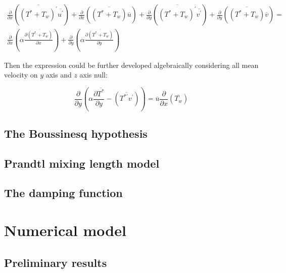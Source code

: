 \documentclass[10pt]{article} %
\begin{document}
\begin{equation}
\begin{split}
\frac{\partial{}}{\partial{x}} \left(\overline{(T^\ast + T_w)^\prime} \overline{ u^\prime}\right) + \frac{\partial{}}{\partial{x}}\left(\overline{(T^\ast + T_w)} \overline{u}\right)+ 
\frac{\partial{}}{\partial{y}} \left(\overline{(T^\ast + T_w)^\prime} \overline{ v^\prime}\right) + \frac{\partial{}}{\partial{y}}\left(\overline{(T^\ast + T_w)} \overline{v}\right) = \\
{\frac{\partial{}}{\partial{x}}} \left(\alpha {\frac{\partial{\overline{(T^\ast + T_w)}}}{\partial{x}}} \right) +
{\frac{\partial{}}{\partial{y}}} \left(\alpha {\frac{\partial{\overline{(T^\ast + T_w)}}}{\partial{y}}} \right) 
\end{split}
\end{equation}

Then the expression could be further developed algebraically considering all mean velocity on $y$ axis and $z$ axis null:

\begin{equation}\label{equation_var}
{\frac{\partial{}}{\partial{y}}} \left(\alpha {\frac{\partial{\overline{T^\ast}}}{\partial{y}}}   
- \left(\overline{ T^{\ast\prime} v^\prime}\right) \right)
= 
\overline{u}\frac{\partial{}}{\partial{x}}\left(\overline{T_w}\right)  
\end{equation}



\subsection{The Boussinesq hypothesis}





\subsection{Prandtl mixing length model} 

\subsection{The damping function}

\section{Numerical model}

\subsection{Preliminary results}
\end{document}
